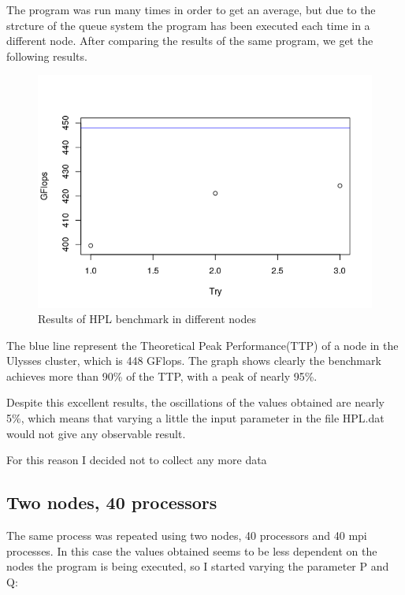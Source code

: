 \documentclass[10pt,a4paper]{article}
\begin{document}
The program was run many times in order to get an average, but due to the strcture of the queue system the program has been executed each time in a different node. After comparing the results of the same program, we get the following results.

\begin{figure}[h]
	\centering
	\includegraphics[width=1.\linewidth]{nointel}
	\caption*{Results of HPL benchmark in different nodes}
	\label{fig:nointel}
\end{figure}

The blue line represent the Theoretical Peak Performance(TTP) of a node in the Ulysses cluster, which is 448 GFlops. The graph shows clearly the benchmark achieves more than 90\% of the TTP, with a peak of nearly 95\%.

Despite this excellent results, the oscillations of the values obtained are nearly 5\%, which means that varying a little the input parameter in the file HPL.dat would not give any observable result.

For this reason I decided not to collect any more data

\subsection{Two nodes, 40 processors}

The same process was repeated using two nodes, 40 processors and 40 mpi processes. In this case the values obtained seems to be less dependent on the nodes the program is being executed, so I started varying the parameter P and Q: 
\vspace{1mm} %
\begin{lstlisting}
	
\end{lstlisting}
\end{document}
